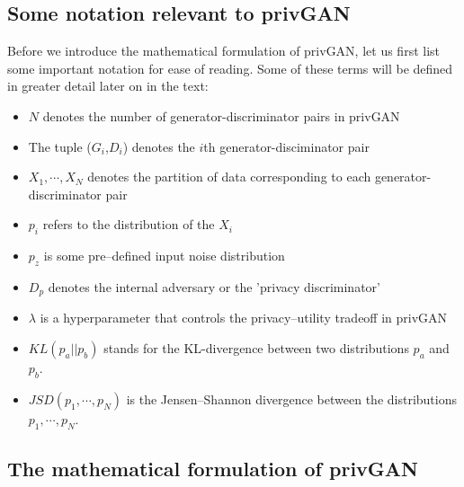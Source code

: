 \documentclass{article}
\begin{document}
\subsection{Some notation relevant to privGAN}
Before we introduce the mathematical formulation of privGAN, let us first list some important notation for ease of reading. Some of these terms will be defined in greater detail later on in the text:   
\begin{itemize}
    \item $N$ denotes the number of generator-discriminator pairs in privGAN
    \item The tuple ($G_i$,$D_i$) denotes the $i$th generator-disciminator pair
    \item $X_1, \cdots, X_N$ denotes the partition of data corresponding to each generator-discriminator pair
    \item $p_i$ refers to the distribution of the $X_i$
    \item $p_z$ is some pre--defined input noise distribution
    \item $D_p$ denotes the internal adversary or the 'privacy discriminator'
    \item $\lambda$ is a hyperparameter that controls the privacy--utility tradeoff in privGAN
    \item $KL(p_a||p_b)$ stands for the KL-divergence between two distributions $p_a$ and $p_b$.
    \item $JSD(p_1,\cdots,p_N)$ is the Jensen--Shannon divergence between the distributions $p_1,\cdots,p_N$. 
\end{itemize}
\subsection{The mathematical formulation of privGAN}
\end{document}
